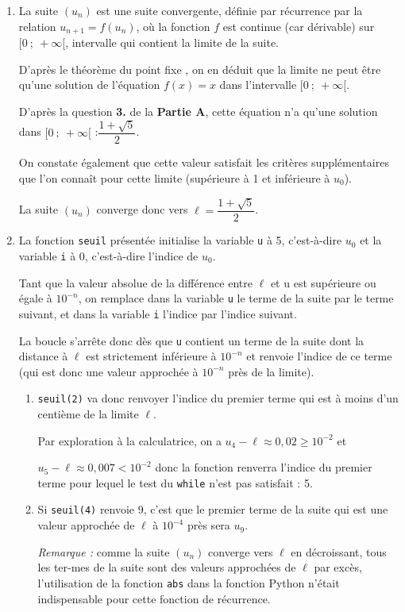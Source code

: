 \begin{enumerate}
	\item La suite $\left(u_n\right)$ est une suite convergente, définie par récurrence par la relation \linebreak $u_{n+1} = f(u_n)$, où la fonction $f$ est continue (car dérivable) sur $ [0 ~;~ +\infty[$, intervalle qui contient la limite de la suite.

D'après le théorème \og du point fixe \fg{}, on en déduit que la limite ne peut être qu'une solution de l'équation $f(x) = x$ dans l'intervalle $ [0 ~;~ +\infty[ $.

D'après la question \textbf{3.} de la \textbf{Partie A}, cette équation n'a qu'une solution dans \linebreak $ [0 ~;~ +\infty[ $ :\quad $\dfrac{1+\sqrt{5}}{2}$.

On constate également que cette valeur satisfait les critères supplémentaires que l'on connaît pour cette limite (supérieure à 1 et inférieure à $u_0$).

La suite $\left(u_n\right)$ converge donc vers $\ell = \dfrac{1+\sqrt{5}}{2}$.

	\item La fonction \texttt{seuil} présentée initialise la variable \texttt{u} à 5, c'est-à-dire $u_0$ et la variable \texttt{i} à 0, c'est-à-dire l'indice de $u_0$.

Tant que la valeur absolue de la différence entre $\ell$ et u est supérieure ou égale à $10^{-n}$, on remplace dans la variable \texttt{u} le terme de la suite par le terme suivant, et dans la variable \texttt{i} l'indice par l'indice suivant.

		La boucle s'arrête donc dès que \texttt{u} contient un terme de la suite dont la distance à $\ell$ est strictement inférieure à $10^{-n}$ et renvoie l'indice de ce terme (qui est donc une valeur approchée à $10^{-n}$ près de la limite).
		\begin{enumerate}
			\item \texttt{seuil(2)} va donc renvoyer l'indice du premier terme qui est à moins d'un centième de la limite $\ell$.

Par exploration à la calculatrice, on a $u_4 - \ell \approx 0,02 \geqslant 10^{-2}$ et 

$u_5 - \ell \approx 0,007 < 10^{-2}$ donc la fonction renverra l'indice du premier terme pour lequel le test du \texttt{while} n'est pas satisfait : 5.

			\item Si \texttt{seuil(4)} renvoie 9, c'est que le premier terme de la suite qui est une valeur approchée de $\ell$ à $10^{-4}$ près sera $u_9$.

			\emph{Remarque :} comme la suite $\left(u_n\right)$ converge vers $\ell$ en décroissant, tous les ter-mes de la suite sont des valeurs approchées de $\ell$ par excès, l'utilisation de la fonction \texttt{abs}  dans la fonction Python n'était indispensable pour cette fonction de récurrence.
	\end{enumerate}
\end{enumerate}
